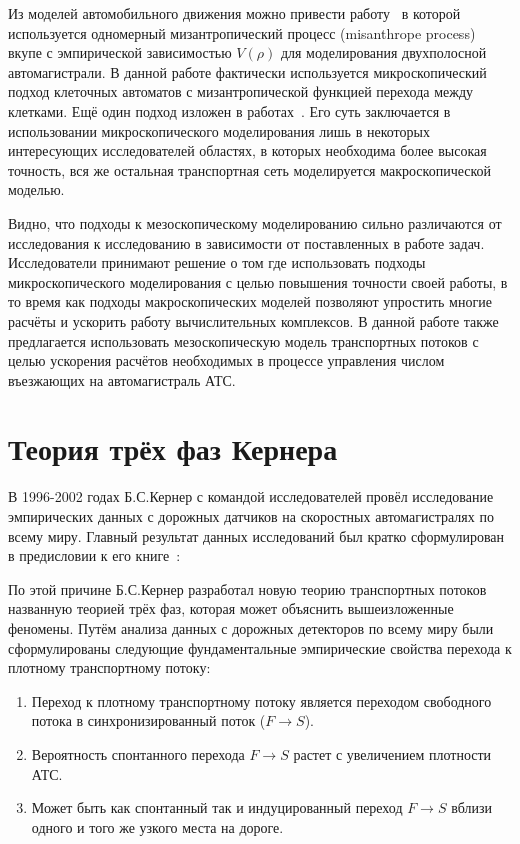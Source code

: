 Из моделей автомобильного движения можно привести работу~\cite{kanai2010two} в которой используется одномерный мизантропический процесс (misanthrope process) вкупе с эмпирической зависимостью \(V(\rho)\) для моделирования двухполосной автомагистрали.
В данной работе фактически используется микроскопический подход клеточных автоматов с мизантропической функцией перехода между клетками.
Ещё один подход изложен в работах~\cite{burghout2005hybrid,magne2000towards}. Его суть заключается в использовании микроскопического моделирования лишь в некоторых интересующих исследователей областях, в которых необходима более высокая точность, вся же остальная транспортная сеть моделируется макроскопической моделью.

Видно, что подходы к мезоскопическому моделированию сильно различаются от исследования к исследованию в зависимости от поставленных в работе задач.
Исследователи принимают решение о том где использовать подходы микроскопического моделирования с целью повышения точности своей работы, в то время как подходы макроскопических моделей позволяют упростить многие расчёты и ускорить работу вычислительных комплексов.
В данной работе также предлагается использовать мезоскопическую модель транспортных потоков с целью ускорения расчётов необходимых в процессе управления числом въезжающих на автомагистраль АТС.

\section{Теория трёх фаз Кернера}\label{subsec:ch1/sec4_kerner}
В 1996-2002 годах Б.С.Кернер с командой исследователей провёл исследование эмпирических данных с дорожных датчиков на скоростных автомагистралях по всему миру.
Главный результат данных исследований был кратко сформулирован в предисловии к его книге~\cite{kerner2009introduction}:


По этой причине Б.С.Кернер разработал новую теорию транспортных потоков названную теорией трёх фаз, которая может объяснить вышеизложенные феномены.
Путём анализа данных с дорожных детекторов по всему миру были сформулированы следующие фундаментальные эмпирические свойства перехода к плотному транспортному потоку:
\begin{enumerate}
  \item Переход к плотному транспортному потоку является переходом свободного потока в синхронизированный поток (\(F\rightarrow S\)).
  \item Вероятность спонтанного перехода \(F\rightarrow S\) растет с увеличением плотности АТС.
  \item Может быть как спонтанный так и индуцированный переход \(F\rightarrow S\) вблизи одного и того же узкого места на дороге.
\end{enumerate}

